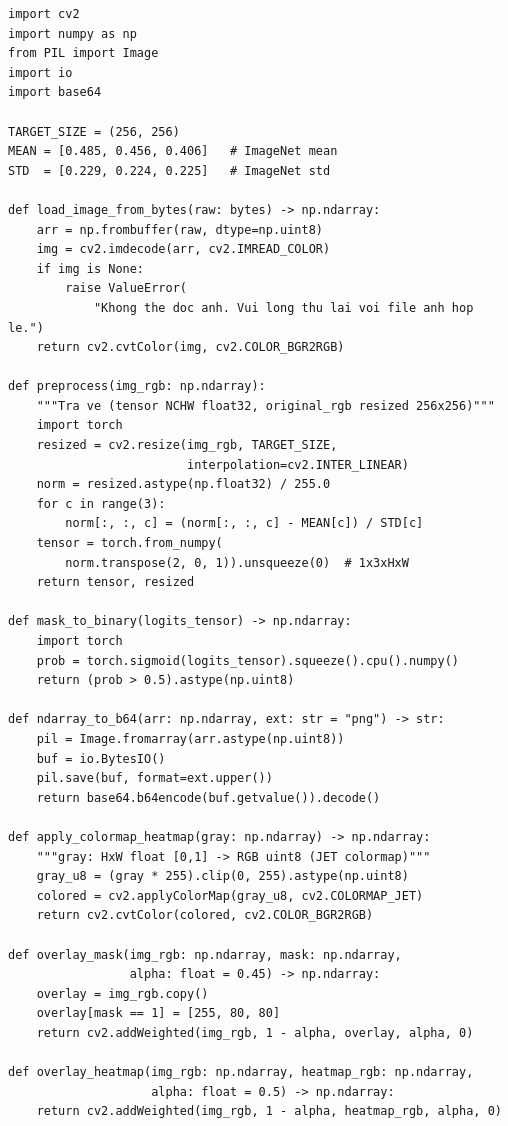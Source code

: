 \begin{lstlisting}[style=codePython, caption={Tien xu ly anh MRI: doc, resize 256x256, chuan hoa ImageNet (app/utils/image\_utils.py)}]
import cv2
import numpy as np
from PIL import Image
import io
import base64

TARGET_SIZE = (256, 256)
MEAN = [0.485, 0.456, 0.406]   # ImageNet mean
STD  = [0.229, 0.224, 0.225]   # ImageNet std

def load_image_from_bytes(raw: bytes) -> np.ndarray:
    arr = np.frombuffer(raw, dtype=np.uint8)
    img = cv2.imdecode(arr, cv2.IMREAD_COLOR)
    if img is None:
        raise ValueError(
            "Khong the doc anh. Vui long thu lai voi file anh hop le.")
    return cv2.cvtColor(img, cv2.COLOR_BGR2RGB)

def preprocess(img_rgb: np.ndarray):
    """Tra ve (tensor NCHW float32, original_rgb resized 256x256)"""
    import torch
    resized = cv2.resize(img_rgb, TARGET_SIZE,
                         interpolation=cv2.INTER_LINEAR)
    norm = resized.astype(np.float32) / 255.0
    for c in range(3):
        norm[:, :, c] = (norm[:, :, c] - MEAN[c]) / STD[c]
    tensor = torch.from_numpy(
        norm.transpose(2, 0, 1)).unsqueeze(0)  # 1x3xHxW
    return tensor, resized

def mask_to_binary(logits_tensor) -> np.ndarray:
    import torch
    prob = torch.sigmoid(logits_tensor).squeeze().cpu().numpy()
    return (prob > 0.5).astype(np.uint8)

def ndarray_to_b64(arr: np.ndarray, ext: str = "png") -> str:
    pil = Image.fromarray(arr.astype(np.uint8))
    buf = io.BytesIO()
    pil.save(buf, format=ext.upper())
    return base64.b64encode(buf.getvalue()).decode()

def apply_colormap_heatmap(gray: np.ndarray) -> np.ndarray:
    """gray: HxW float [0,1] -> RGB uint8 (JET colormap)"""
    gray_u8 = (gray * 255).clip(0, 255).astype(np.uint8)
    colored = cv2.applyColorMap(gray_u8, cv2.COLORMAP_JET)
    return cv2.cvtColor(colored, cv2.COLOR_BGR2RGB)

def overlay_mask(img_rgb: np.ndarray, mask: np.ndarray,
                 alpha: float = 0.45) -> np.ndarray:
    overlay = img_rgb.copy()
    overlay[mask == 1] = [255, 80, 80]
    return cv2.addWeighted(img_rgb, 1 - alpha, overlay, alpha, 0)

def overlay_heatmap(img_rgb: np.ndarray, heatmap_rgb: np.ndarray,
                    alpha: float = 0.5) -> np.ndarray:
    return cv2.addWeighted(img_rgb, 1 - alpha, heatmap_rgb, alpha, 0)
\end{lstlisting}

